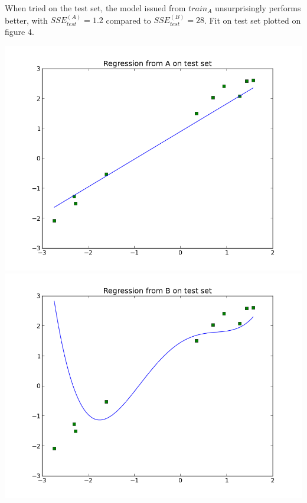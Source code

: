 \documentclass[twoside]{article}
\begin{document}
When tried on the test set, the model issued from $train_A$ unsurprisingly performs better, with $SSE_{test}^{(A)} = 1.2$ compared to $SSE_{test}^{(B)} = 28$. Fit on test set plotted on figure 4.

\begingroup
\centering
\includegraphics[scale=0.17]{./img/test_rega.png}
\includegraphics[scale=0.17]{./img/test_regb.png}
\endgroup
\end{document}
